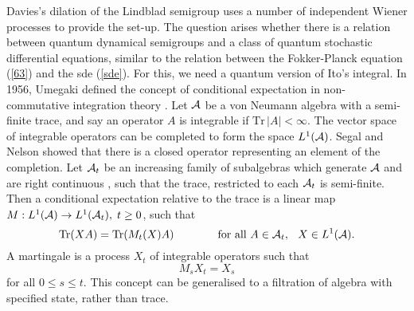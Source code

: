 Davies's dilation of the Lindblad semigroup uses a number
of independent Wiener processes to provide the set-up.
The question arises whether there is a relation between quantum dynamical
semigroups and a class of quantum stochastic differential equations, similar
to the relation between the Fokker-Planck equation (\ref{63}) and the sde
(\ref{sde}). For this, we need a quantum version of Ito's integral.
In 1956, Umegaki defined the concept of conditional expectation in
non-commutative integration theory \cite{Umegaki}. Let ${\cal A}$ be a
von Neumann algebra
with a semi-finite trace, and say an operator $A$ is integrable if
$\mbox{Tr}\,|A|<\infty$. The vector space of integrable operators can
be completed to form the space $L^1({\cal A})$. Segal and Nelson showed
that there
is a closed operator representing an element of the completion.
Let ${\cal A}_t$ be an increasing family
of subalgebras which generate ${\cal A}$ and are right continuous
\cite{Barnett}, such that the trace, restricted to each ${\cal A}_t$
is semi-finite.
Then a conditional expectation relative to the trace
is a linear map $M:L^1({\cal A})\rightarrow L^1({\cal A}_t),\;t\geq 0$,
such that
\[\mbox{Tr}(XA)=\mbox{Tr}(M_t(X)A)\hspace{.5in}\mbox{ for all }A\in{\cal
A}_t,\hspace{.1in}X\in L^1({\cal A}).\]
A martingale is a process $X_t$ of integrable operators such that
\[M_sX_t=X_s\]
for all $0\leq s\leq t$.
This concept can be generalised to a filtration of algebra with specified
state, rather than trace.

